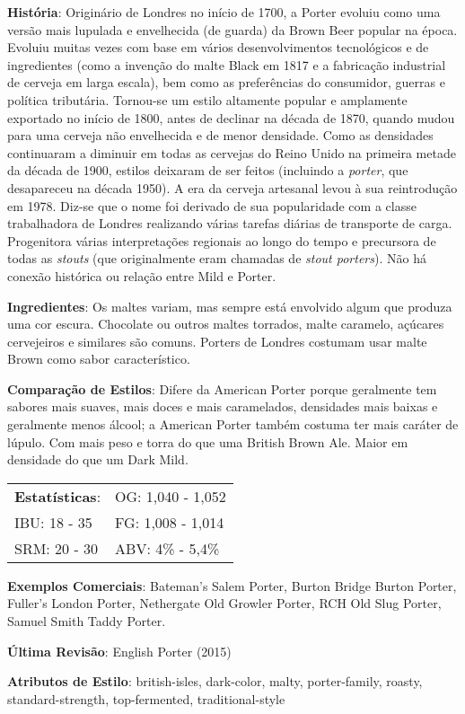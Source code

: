 \textbf{História}: Originário de Londres no início de 1700, a Porter evoluiu como uma versão mais lupulada e envelhecida (de guarda) da Brown Beer popular na época. Evoluiu muitas vezes com base em vários desenvolvimentos tecnológicos e de ingredientes (como a invenção do malte Black em 1817 e a fabricação industrial de cerveja em larga escala), bem como as preferências do consumidor, guerras e política tributária. Tornou-se um estilo altamente popular e amplamente exportado no início de 1800, antes de declinar na década de 1870, quando mudou para uma cerveja não envelhecida e de menor densidade. Como as densidades continuaram a diminuir em todas as cervejas do Reino Unido na primeira metade da década de 1900, estilos deixaram de ser feitos (incluindo a \textit{porter}, que desapareceu na década 1950). A era da cerveja artesanal levou à sua reintrodução em 1978. Diz-se que o nome foi derivado de sua popularidade com a classe trabalhadora de Londres realizando várias tarefas diárias de transporte de carga. Progenitora várias interpretações regionais ao longo do tempo e precursora de todas as \textit{stouts} (que originalmente eram chamadas de \textit{stout porters}). Não há conexão histórica ou relação entre Mild e Porter.

\textbf{Ingredientes}: Os maltes variam, mas sempre está envolvido algum que produza uma cor escura. Chocolate ou outros maltes torrados, malte caramelo, açúcares cervejeiros e similares são comuns. Porters de Londres costumam usar malte Brown como sabor característico.

\textbf{Comparação de Estilos}: Difere da American Porter porque geralmente tem sabores mais suaves, mais doces e mais caramelados, densidades mais baixas e geralmente menos álcool; a American Porter também costuma ter mais caráter de lúpulo. Com mais peso e torra do que uma British Brown Ale. Maior em densidade do que um Dark Mild.

\begin{tabular}{@{}p{35mm}p{35mm}@{}}
  \textbf{Estatísticas}: & OG: 1,040 - 1,052 \\
  IBU: 18 - 35  & FG: 1,008 - 1,014  \\
  SRM: 20 - 30  & ABV: 4\% - 5,4\%
\end{tabular}

\textbf{Exemplos Comerciais}: Bateman’s Salem Porter, Burton Bridge Burton Porter, Fuller's London Porter, Nethergate Old Growler Porter, RCH Old Slug Porter, Samuel Smith Taddy Porter.

\textbf{Última Revisão}: English Porter (2015)

\textbf{Atributos de Estilo}: british-isles, dark-color, malty, porter-family, roasty, standard-strength, top-fermented, traditional-style
